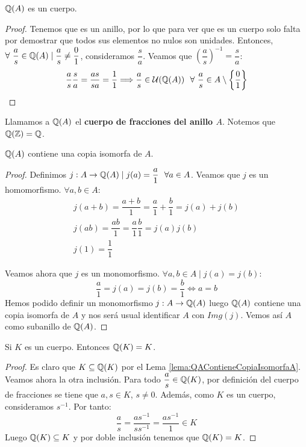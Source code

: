 \begin{lema}
    $\mathbb Q(A)$ es un cuerpo.
\end{lema}
\begin{proof} Tenemos que es un anillo, por lo que para ver que es un cuerpo solo falta por demostrar que todos sus elementos no nulos son unidades. Entonces, $\forall ~\dfrac{a}{s} \in \mathbb Q(A) \mid \dfrac{a}{s} \neq \dfrac{0}{1}$, consideramos $\dfrac{s}{a}$. Veamos que $\left(\dfrac{a}{s}\right)^{-1} = \dfrac{s}{a}$:
    $$\dfrac{a}{s}\dfrac{s}{a} = \dfrac{as}{sa} = \dfrac{1}{1} \Longrightarrow \dfrac{a}{s} \in \mathcal{U}(\mathbb Q(A))~~\forall ~\dfrac{a}{s}
        \in A \setminus\left\{\dfrac{0}{1}\right\}$$
\end{proof}

\bigskip

\noindent
Llamamos a $\mathbb Q(A)$ el \textbf{cuerpo de fracciones del anillo $A$}. Notemos que $\mathbb Q(\mathbb Z) = \mathbb Q$.

\begin{lema}
    \label{lema:QAContieneCopiaIsomorfaA}
    $\mathbb Q(A)$ contiene una copia isomorfa de $A$.
\end{lema}
\begin{proof}
    Definimos $j:A\rightarrow \mathbb Q(A) \mid j(a) = \dfrac{a}{1}~~\forall a \in A$.
    Veamos que $j$ es un homomorfismo. $\forall a,b \in A$:
    \begin{gather*}
        j(a+b) = \dfrac{a+b}{1} = \dfrac{a}{1} + \dfrac{b}{1} = j(a) + j(b) \\
        j(ab) = \dfrac{ab}{1} = \dfrac{a}{1} \dfrac{b}{1} = j(a)j(b) \\
        j(1) = \dfrac{1}{1}
    \end{gather*}
    
    Veamos ahora que $j$ es un monomorfismo. $\forall a,b \in A \mid j(a) = j(b)$:
    $$\dfrac{a}{1} = j(a) = j(b) = \dfrac{b}{1} \Longleftrightarrow a = b$$
    Hemos podido definir un monomorfismo $j:A\rightarrow \mathbb Q(A)$ luego $\mathbb Q(A)$ contiene una copia isomorfa de $A$ y nos será usual identificar $A$ con $Img(j)$. Vemos así $A$ como subanillo de $\mathbb Q(A)$.
\end{proof}

\begin{lema}
    Si $K$ es un cuerpo. Entonces $\mathbb Q(K) = K$.
\end{lema}
\begin{proof}
    Es claro que $K \subseteq \mathbb Q(K)$ por el Lema \ref{lema:QAContieneCopiaIsomorfaA}. Veamos ahora la otra inclusión. Para todo $\dfrac{a}{s} \in \mathbb Q(K)$, por definición del cuerpo de fracciones se tiene que $a,s\in K$, $s\neq 0$. Además, como $K$ es un cuerpo, consideramos $s^{-1}$. Por tanto:
    $$\dfrac{a}{s} = \dfrac{as^{-1}}{ss^{-1}} = \dfrac{as^{-1}}{1} \in K$$
    Luego $\mathbb Q(K) \subseteq K$ y por doble inclusión tenemos que $\mathbb Q(K) = K$.
\end{proof}


